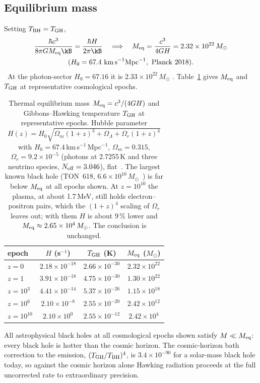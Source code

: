 \subsection{Equilibrium mass}
Setting $T_{\rm BH}=T_{\rm GH}$,
\begin{equation}
\begin{gathered}\frac{\hbar c^3}{8\pi GM_{\rm eq}\kB}=\frac{\hbar H}{2\pi\kB}\quad\Longrightarrow\quad M_{\rm eq}=\frac{c^3}{4GH}=2.32\times10^{22}\,M_\odot\\(H_0=67.4\ \text{km\,s}^{-1}\text{Mpc}^{-1},\ \text{Planck 2018}).\end{gathered}\label{eq:bh_Meq}
\end{equation}
\derived\ At the photon-sector $H_0=67.16$ it is $2.33\times10^{22}\,M_\odot$ \calc. Table~\ref{tab:bh_meq} gives $M_{\rm eq}$ and $T_{\rm GH}$ at representative cosmological epochs.
\begin{table}[htbp]\centering\small
\caption{Thermal equilibrium mass $M_{\rm eq}=c^3/(4GH)$ and Gibbons--Hawking temperature $T_{\rm GH}$ at representative epochs. Hubble parameter
$H(z)=H_0\sqrt{\Omega_m(1+z)^3+\Omega_\Lambda+\Omega_r(1+z)^4}$ with $H_0=67.4$\,km\,s$^{-1}$\,Mpc$^{-1}$, $\Omega_m=0.315$, $\Omega_r=9.2\times10^{-5}$ (photons at 2.7255\,K and three neutrino species, $N_{\rm eff}=3.046$), flat~\cite{Planck2018VI}.
The largest known black hole (TON~618, $6.6\times10^{10}\,M_\odot$~\cite{Shemmer2004}) is far below $M_{\rm eq}$ at all epochs shown. At $z=10^{10}$ the plasma, at about 1.7\,MeV, still holds electron--positron pairs, which the $(1+z)^4$ scaling of $\Omega_r$ leaves out; with them $H$ is about 9\,\% lower and $M_{\rm eq}\approx2.65\times10^{4}\,M_\odot$. The conclusion is unchanged. \calc}\label{tab:bh_meq}
\begin{tabular}{lccc}\toprule
epoch & $H$ (s$^{-1}$) & $T_{\rm GH}$ (K) & $M_{\rm eq}$ ($M_\odot$)\\\midrule
$z=0$ & $2.18\times10^{-18}$ & $2.66\times10^{-30}$ & $2.32\times10^{22}$\\
$z=1$ & $3.91\times10^{-18}$ & $4.75\times10^{-30}$ & $1.30\times10^{22}$\\
$z=10^3$ & $4.41\times10^{-14}$ & $5.37\times10^{-26}$ & $1.15\times10^{18}$\\
$z=10^6$ & $2.10\times10^{-8}$ & $2.55\times10^{-20}$ & $2.42\times10^{12}$\\
$z=10^{10}$ & $2.10\times10^{0}$ & $2.55\times10^{-12}$ & $2.42\times10^{4}$\\\bottomrule
\end{tabular}
\end{table}
All astrophysical black holes at all cosmological epochs shown satisfy $M\ll M_{\rm eq}$: every black hole is hotter than the cosmic horizon. The cosmic-horizon
bath correction to the emission, $(T_{\rm GH}/T_{\rm BH})^4$, is $3.4\times10^{-90}$ for a solar-mass black hole today, so against the cosmic horizon alone Hawking radiation
proceeds at the full uncorrected rate to extraordinary precision. \calc

